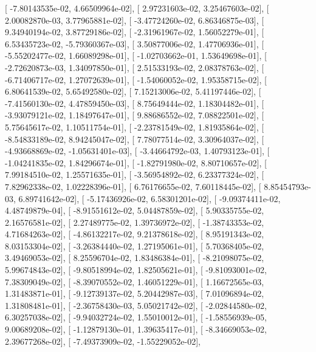 \documentclass{article}
\begin{document}
       [ -7.80143535e-02,   4.66509964e-02],
       [  2.97231603e-02,   3.25467603e-02],
       [  2.00082870e-03,   3.77965881e-02],
       [ -3.47724260e-02,   6.86346875e-03],
       [  9.34940194e-02,   3.87729186e-02],
       [ -2.31961967e-02,   1.56052279e-01],
       [  6.53435723e-02,  -5.79360367e-03],
       [  3.50877006e-02,   1.47706936e-01],
       [ -5.55202477e-02,   1.66089298e-01],
       [ -1.02703662e-01,   1.53649698e-01],
       [ -2.72620873e-03,   1.34097850e-01],
       [  2.51533193e-02,   2.08378763e-02],
       [ -6.71406717e-02,   1.27072639e-01],
       [ -1.54060052e-02,   1.95358715e-02],
       [  6.80641539e-02,   5.65492580e-02],
       [  7.15213006e-02,   5.41197446e-02],
       [ -7.41560130e-02,   4.47859450e-03],
       [  8.75649444e-02,   1.18304482e-01],
       [ -3.93079121e-02,   1.18497647e-01],
       [  9.88686552e-02,   7.08822501e-02],
       [  5.75645617e-02,   1.10511754e-01],
       [ -2.23781549e-02,   1.81935864e-02],
       [ -8.54833189e-02,   8.94245047e-02],
       [  7.78077514e-02,   3.30964037e-02],
       [ -4.93668869e-02,  -1.05631401e-03],
       [ -3.44664792e-03,   1.40793123e-01],
       [ -1.04241835e-02,   1.84296674e-01],
       [ -1.82791980e-02,   8.80710657e-02],
       [  7.99184510e-02,   1.25571635e-01],
       [ -3.56954892e-02,   6.23377324e-02],
       [  7.82962338e-02,   1.02228396e-01],
       [  6.76176655e-02,   7.60118445e-02],
       [  8.85454793e-03,   6.89741642e-02],
       [ -5.17436926e-02,   6.58301201e-02],
       [ -9.09374411e-02,   4.48749879e-04],
       [ -8.91551612e-02,   5.04487859e-02],
       [  5.90335755e-02,   2.16576581e-02],
       [  2.27489775e-02,   1.39736972e-02],
       [ -1.38743353e-02,   4.71684263e-02],
       [ -4.86132217e-02,   9.21378618e-02],
       [  8.95191343e-02,   8.03153304e-02],
       [ -3.26384440e-02,   1.27195061e-01],
       [  5.70368405e-02,   3.49469053e-02],
       [  8.25596704e-02,   1.83486384e-01],
       [ -8.21098075e-02,   5.99674843e-02],
       [ -9.80518994e-02,   1.82505621e-01],
       [ -9.81093001e-02,   7.38309049e-02],
       [ -8.39070552e-02,   1.46051229e-01],
       [  1.16672565e-03,   1.31483871e-01],
       [ -9.12739137e-02,   5.20442987e-03],
       [  7.01096894e-02,   1.31808481e-01],
       [ -2.36758430e-03,   5.05021742e-02],
       [ -2.02844580e-02,   6.30257038e-02],
       [ -9.94032724e-02,   1.55010012e-01],
       [ -1.58556939e-05,   9.00689208e-02],
       [ -1.12879130e-01,   1.39635417e-01],
       [ -8.34669053e-02,   2.39677268e-02],
       [ -7.49373909e-02,  -1.55229052e-02],
\end{document}
